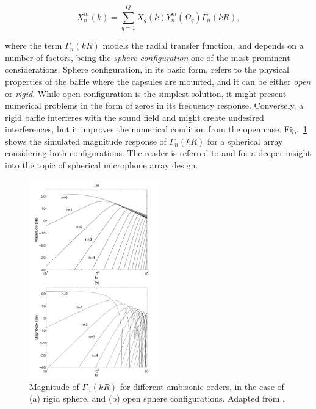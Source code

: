 \begin{equation}
	X_n^m(k) = \sum_{q=1}^{Q} X_q(k) Y_n^m(\Omega_q) \Gamma_n(kR),
	\label{eq:a2b}
\end{equation}

where the term $\Gamma_n(kR)$ models the radial transfer function, and depends on a number of factors, being the \textit{sphere configuration} one of the most prominent considerations. 
Sphere configuration, in its basic form, refers to the physical properties of the baffle where the capsules are mounted, and it can be either \textit{open} or \textit{rigid}. 
While open configuration is the simplest solution, it might present numerical problems in the form of zeros in its frequency response. Conversely, a rigid baffle interferes with the sound field and might create undesired interferences, but it improves the numerical condition from the open case. Fig.~\ref{fig:magnitude_kr} shows the simulated magnitude response of $\Gamma_n(kR)$  for a spherical array considering both configurations. 
The reader is referred to \cite{moreau20063d} and \cite{rafaely2004analysis}  for a deeper insight into the topic of spherical microphone array design.

%


\begin{figure}[hbt]
\begin{center}
  \includegraphics[width=0.5\textwidth]{Figures/ScientificBackground/magnitude_kr.png}
  \caption{Magnitude of $\Gamma_n(kR)$ for different ambisonic orders, in the case of (a) rigid sphere, and (b) open sphere configurations. Adapted from \cite{rafaely2004analysis}. }
	\label{fig:magnitude_kr}
	\end{center}
\end{figure}



